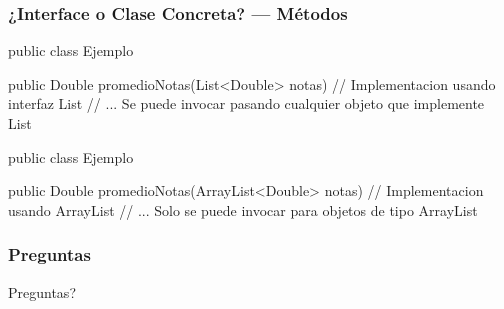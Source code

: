 \documentclass{beamer}
\begin{document}
\begin{frame}[fragile]
  \frametitle{¿Interface o Clase Concreta? --- Métodos}

  \begin{jsmall}
    public class Ejemplo {

      public Double promedioNotas(List<Double> notas) {
        // Implementacion usando interfaz List
        // ... Se puede invocar pasando cualquier objeto que implemente List
      }
    }
  \end{jsmall}
  \begin{jsmall}       
    public class Ejemplo {

      public Double promedioNotas(ArrayList<Double> notas) {
        // Implementacion usando ArrayList
        // ... Solo se puede invocar para objetos de tipo ArrayList
      }
    }    
  \end{jsmall}

\end{frame}

\begin{frame}
  \frametitle{Preguntas}
  \hspace{4cm}\huge{Preguntas?}  
\end{frame}
\end{document}
